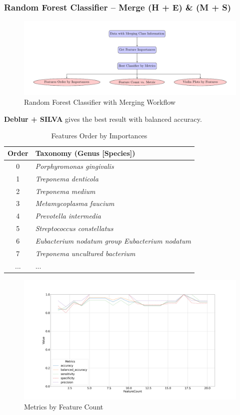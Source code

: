 \documentclass{beamer}
\begin{document}
    \begin{frame}[allowframebreaks]
        \frametitle{Random Forest Classifier -- Merge (H + E) \& (M + S)}

        \begin{figure}
            \includegraphics[width=0.8 \linewidth]{figures/RandomForest/merge.pdf}
            \caption{Random Forest Classifier with Merging Workflow}
        \end{figure}

        \textbf{Deblur + SILVA} gives the best result with balanced accuracy.

        \begin{table}
            \caption{Features Order by Importances}
            \begin{tabular}{c|l}
                Order & Taxonomy (Genus [Species]) \\ \hline
                0 & \textit{Porphyromonas gingivalis} \\
                1 & \textit{Treponema denticola} \\
                2 & \textit{Treponema medium} \\
                3 & \textit{Metamycoplasma faucium} \\
                4 & \textit{Prevotella intermedia} \\
                5 & \textit{Streptococcus constellatus} \\
                6 & \textit{Eubacterium nodatum group Eubacterium nodatum} \\
                7 & \textit{Treponema uncultured bacterium} \\
                ... & ... \\
            \end{tabular}
        \end{table}

        \begin{figure}
            \includegraphics[width=0.8 \linewidth]{figures/RandomForest/one-two.Deblur.silva/metrics.png}
            \caption{Metrics by Feature Count}
        \end{figure}


\end{frame}
\end{document}
